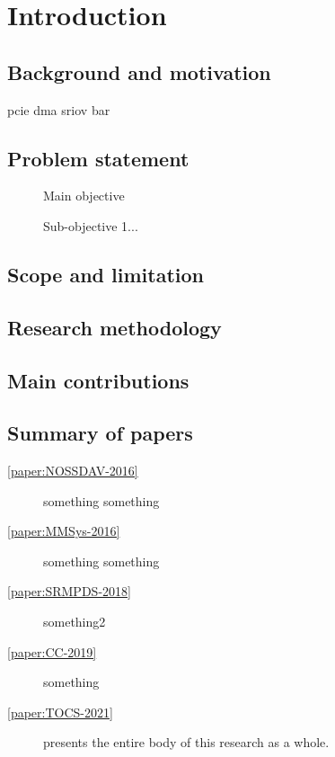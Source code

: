 \chapter{Introduction}\label{sec:intro}
\section{Background and motivation}
\Gls{pcie} \gls{dma} \gls{sriov} \gls{bar}

\section{Problem statement}
\begin{description}
	\item[] Main objective
	\item[] Sub-objective 1...
\end{description}

\section{Scope and limitation}

\section{Research methodology}

\section{Main contributions}

\section{Summary of papers}
\begin{description}
	\item[\cref{paper:NOSSDAV-2016}] something something
	\item[\cref{paper:MMSys-2016}] something something
	\item[\cref{paper:SRMPDS-2018}] something2
	\item[\cref{paper:CC-2019}] something
	\item[\cref{paper:TOCS-2021}] presents the entire body of this research as a whole.
\end{description}
